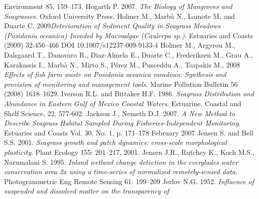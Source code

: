 \documentclass[11pt]{article}
\begin{document}
\begin{thebibliography}{999}
Environment 85, 159–173. \pageref{Hochberg03b}
Hogarth P. 2007. \emph{The Biology of Mangroves and Seagrasses}. Oxford University Press. \pageref{Hogarth07}
Holmer M., Marb\`a N., Lamote M. and Duarte C. 2009\emph{Deterioration of Sediment Quality in Seagrass Meadows (\textit{Posidonia oceanica}) Invaded by Macroalgae (Caulerpa sp.)}. Estuaries
and Coasts (2009) 32:456–466 DOI 10.1007/s12237-009-9133-4 \pageref{Hogarth07}
Holmer M., Argyrou M., Dalsgaard T., Danovaro R., Diaz-Almela E., Duarte C., Frederiksen M., Grau A., Karakassis I., Marb\`a N., Mirto S., P\'erez M., Pusceddu A., Tsapakis M., 2008
\emph{Effects of fish farm waste on \textit{Posidonia oceanica} meadows: Synthesis and provision of
monitoring and management tools}. Marine Pollution Bulletin 56 (2008) 1618–1629. \pageref{Holmer08}
Iverson R.L. and Bittaker H.F. 1986. \emph{Seagrass Distribution and Abundance in Eastern
Gulf of Mexico Coastal Waters}. Estuarine, Coastal and Shelf Science, 22, 577-602. \pageref{Iverson86}
Jackson J., Nemeth D.J. 2007. \emph{A New Method to Describe Seagrass Habitat Sampled
During Fisheries-Independent Monitoring}. Estuaries and Coasts Vol. 30, No. 1, p. 171–178 February 2007 \pageref{Jackson07}
Jensen S. and Bell S.S. 2001. \emph{Seagrass growth and patch dynamics: cross-scale
morphological plasticity}. Plant Ecology 155: 201–217, 2001. \pageref{Jensen01}
Jensen J.R., Rutchey K., Koch M.S., Narumalani S. 1995. \emph{Inland wetland change detection in the everglades water conservation area 2a using a time-series of normalized
remotely-sensed data}. Photogrammetric Eng Remote Sensing 61: 199–209 \pageref{Jensen95}
Jerlov N.G. 1952. \emph{Influence of suspended and dissolved matter on the transparency of
}
\end{thebibliography}
\end{document}
